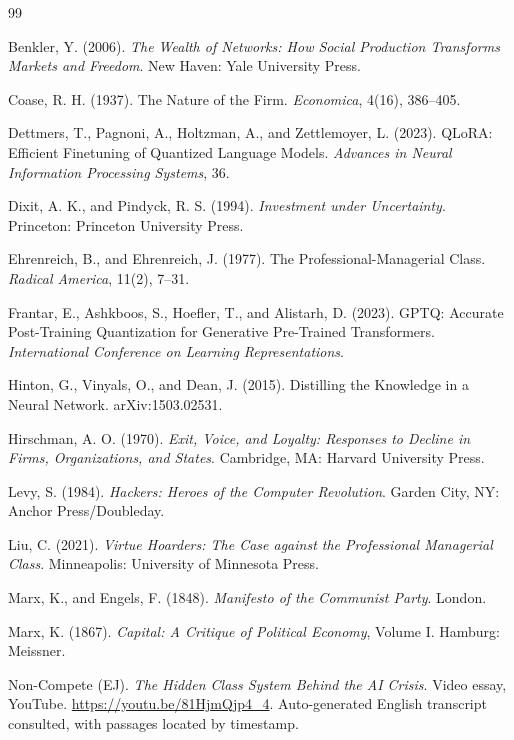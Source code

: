 \documentclass[11pt]{article}
\theoremstyle{plain}
\theoremstyle{definition}
\begin{document}
\begin{thebibliography}{99}

Benkler, Y. (2006). \emph{The Wealth of Networks: How Social Production Transforms Markets and Freedom}. New Haven: Yale University Press.

Coase, R. H. (1937). The Nature of the Firm. \emph{Economica}, 4(16), 386--405.

Dettmers, T., Pagnoni, A., Holtzman, A., and Zettlemoyer, L. (2023). QLoRA: Efficient Finetuning of Quantized Language Models. \emph{Advances in Neural Information Processing Systems}, 36.

Dixit, A. K., and Pindyck, R. S. (1994). \emph{Investment under Uncertainty}. Princeton: Princeton University Press.

Ehrenreich, B., and Ehrenreich, J. (1977). The Professional-Managerial Class. \emph{Radical America}, 11(2), 7--31.

Frantar, E., Ashkboos, S., Hoefler, T., and Alistarh, D. (2023). GPTQ: Accurate Post-Training Quantization for Generative Pre-Trained Transformers. \emph{International Conference on Learning Representations}.

Hinton, G., Vinyals, O., and Dean, J. (2015). Distilling the Knowledge in a Neural Network. arXiv:1503.02531.

Hirschman, A. O. (1970). \emph{Exit, Voice, and Loyalty: Responses to Decline in Firms, Organizations, and States}. Cambridge, MA: Harvard University Press.

Levy, S. (1984). \emph{Hackers: Heroes of the Computer Revolution}. Garden City, NY: Anchor Press/Doubleday.

Liu, C. (2021). \emph{Virtue Hoarders: The Case against the Professional Managerial Class}. Minneapolis: University of Minnesota Press.

Marx, K., and Engels, F. (1848). \emph{Manifesto of the Communist Party}. London.

Marx, K. (1867). \emph{Capital: A Critique of Political Economy}, Volume I. Hamburg: Meissner.

Non-Compete (EJ). \emph{The Hidden Class System Behind the AI Crisis}. Video essay, YouTube. \url{https://youtu.be/81HjmQjp4_4}. Auto-generated English transcript consulted, with passages located by timestamp.


\end{thebibliography}
\end{document}
